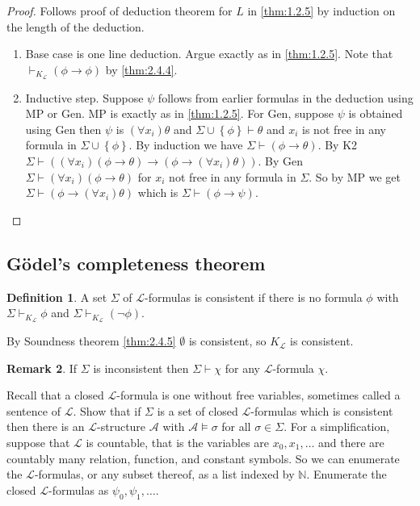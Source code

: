 \documentclass{article}
\newcommand{\N}{\mathbb{N}}
\newcommand{\rb}[1]{\left( #1 \right)}
\newcommand{\cb}[1]{\left\{ #1 \right\}}
\newcommand{\notb}[1]{\rb{\neg #1}}
\newcommand{\impb}[2]{\rb{#1 \rightarrow #2}}
\newcommand{\fab}[1]{\rb{\forall #1}}
\theoremstyle{definition}\newtheorem{definition}{Definition}[subsection]
\theoremstyle{definition}\newtheorem{remark}[definition]{Remark}
\theoremstyle{definition}\newtheorem*{example}{Example}
\theoremstyle{definition}\newtheorem*{note}{Note}
\begin{document}
\begin{proof}
Follows proof of deduction theorem for $ L $ in \ref{thm:1.2.5} by induction on the length of the deduction.
\begin{enumerate}
\item Base case is one line deduction. Argue exactly as in \ref{thm:1.2.5}. Note that $ \vdash_{K_\mathcal{L}} \impb{\phi}{\phi} $ by \ref{thm:2.4.4}.
\item Inductive step. Suppose $ \psi $ follows from earlier formulas in the deduction using MP or Gen. MP is exactly as in \ref{thm:1.2.5}. For Gen, suppose $ \psi $ is obtained using Gen then $ \psi $ is $ \fab{x_i}\theta $ and $ \Sigma \cup \cb{\phi} \vdash \theta $ and $ x_i $ is not free in any formula in $ \Sigma \cup \cb{\phi} $. By induction we have $ \Sigma \vdash \impb{\phi}{\theta} $. By K2 $ \Sigma \vdash \impb{\fab{x_i}\impb{\phi}{\theta}}{\impb{\phi}{\fab{x_i}\theta}} $. By Gen $ \Sigma \vdash \fab{x_i}\impb{\phi}{\theta} $ for $ x_i $ not free in any formula in $ \Sigma $. So by MP we get $ \Sigma \vdash \impb{\phi}{\fab{x_i}\theta} $ which is $ \Sigma \vdash \impb{\phi}{\psi} $.
\end{enumerate}
\end{proof}


\subsection{Gödel's completeness theorem}

\begin{definition}
A set $ \Sigma $ of $ \mathcal{L} $-formulas is consistent if there is no formula $ \phi $ with $ \Sigma \vdash_{K_\mathcal{L}} \phi $ and $ \Sigma \vdash_{K_\mathcal{L}} \notb{\phi} $.
\end{definition}

By Soundness theorem \ref{thm:2.4.5} $ \emptyset $ is consistent, so $ K_\mathcal{L} $ is consistent.

\begin{remark}
If $ \Sigma $ is inconsistent then $ \Sigma \vdash \chi $ for any $ \mathcal{L} $-formula $ \chi $.
\end{remark}

Recall that a closed $ \mathcal{L} $-formula is one without free variables, sometimes called a sentence of $ \mathcal{L} $. Show that if $ \Sigma $ is a set of closed $ \mathcal{L} $-formulas which is consistent then there is an $ \mathcal{L} $-structure $ \mathcal{A} $ with $ \mathcal{A} \vDash \sigma $ for all $ \sigma \in \Sigma $. For a simplification, suppose that $ \mathcal{L} $ is countable, that is the variables are $ x_0, x_1, \dots $ and there are countably many relation, function, and constant symbols. So we can enumerate the $ \mathcal{L} $-formulas, or any subset thereof, as a list indexed by $ \N $. Enumerate the closed $ \mathcal{L} $-formulas as $ \psi_0, \psi_1, \dots $.
\end{document}
